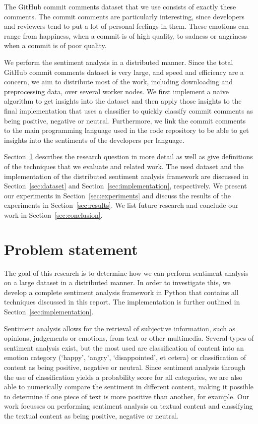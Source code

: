 \documentclass{article}
\begin{document}
The GitHub commit comments dataset that we use consists of exactly these 
comments. The commit comments are particularly interesting, since developers 
and reviewers tend to put a lot of personal feelings in them. These emotions 
can range from happiness, when a commit is of high quality, to sadness or 
angriness when a commit is of poor quality.

We perform the sentiment analysis in a distributed manner. Since the total 
GitHub commit comments dataset is very large, and speed and efficiency are 
a concern, we aim to distribute most of the work, including downloading and 
preprocessing data, over several worker nodes. We first implement a naive 
algorithm to get insights into the dataset and then apply those insights to the 
final implementation that uses a classifier to quickly classify commit comments 
as being positive, negative or neutral. Furthermore, we link the commit 
comments to the main programming language used in the code repository to be 
able to get insights into the sentiments of the developers per language.

Section~\ref{sec:problem} describes the research question in more detail as well
as give definitions of the techniques that we evaluate and related work. The
used dataset and the implementation of the distributed sentiment analysis
framework are discussed in Section~\ref{sec:dataset} and
Section~\ref{sec:implementation}, respectively. We present our experiments in
Section~\ref{sec:experiments} and discuss the results of the experiments in
Section~\ref{sec:results}. We list future research and conclude our work in
Section~\ref{sec:conclusion}.

\section{Problem statement}\label{sec:problem}
The goal of this research is to determine how we can perform sentiment analysis
on a large dataset in a distributed manner. In order to investigate this, we
develop a complete sentiment analysis framework in Python that contains all
techniques discussed in this report. The implementation is further outlined in 
Section~\ref{sec:implementation}.

Sentiment analysis allows for the retrieval of subjective information, such as
opinions, judgements or emotions, from text or other multimedia. Several types
of sentiment analysis exist, but the most used are classification of content
into an emotion category (`happy', `angry', `disappointed', et cetera) or
classification of content as being positive, negative or neutral. Since
sentiment analysis through the use of classification yields a probability score
for all categories, we are also able to numerically compare the sentiment in
different content, making it possible to determine if one piece of text is more
positive than another, for example. Our work focusses on performing sentiment
analysis on textual content and classifying the textual content as being
positive, negative or neutral.
\end{document}
